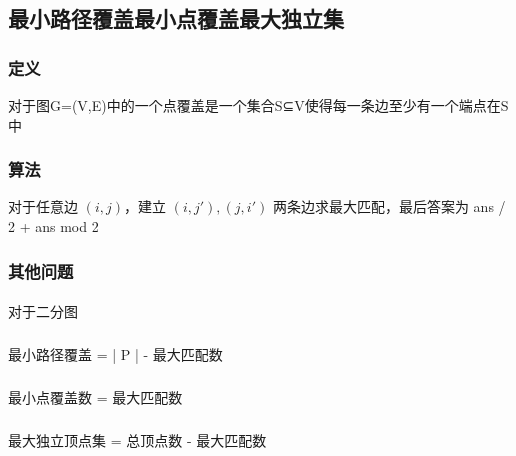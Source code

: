 ﻿\subsection{最小路径覆盖最小点覆盖最大独立集}
	\subsubsection{定义}
		对于图G=(V,E)中的一个点覆盖是一个集合S⊆V使得每一条边至少有一个端点在S中
	\subsubsection{算法}
		对于任意边 $ (i, j) $，建立 $ (i, j'),  (j, i') $  两条边求最大匹配，最后答案为 ans / 2 + ans mod 2
	\subsubsection{其他问题}
		\paragraph{}
			对于二分图
				\subparagraph{} 					
					最小路径覆盖 = | P | - 最大匹配数
				\subparagraph{}
					最小点覆盖数 = 最大匹配数
				\subparagraph{}
					最大独立顶点集 = 总顶点数 - 最大匹配数